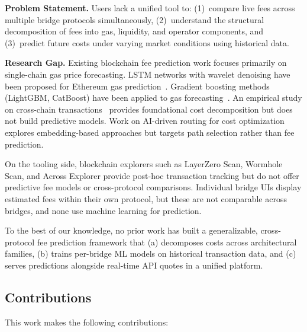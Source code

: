 \textbf{Problem Statement.} Users lack a unified tool to: (1)~compare live fees across multiple bridge protocols simultaneously, (2)~understand the structural decomposition of fees into gas, liquidity, and operator components, and (3)~predict future costs under varying market conditions using historical data.

\textbf{Research Gap.} Existing blockchain fee prediction work focuses primarily on single-chain gas price forecasting. LSTM networks with wavelet denoising have been proposed for Ethereum gas prediction~\cite{lstm_gas}. Gradient boosting methods (LightGBM, CatBoost) have been applied to gas forecasting~\cite{gbm_gas}. An empirical study on cross-chain transactions~\cite{empirical_cc} provides foundational cost decomposition but does not build predictive models. Work on AI-driven routing for cost optimization~\cite{ai_routing} explores embedding-based approaches but targets path selection rather than fee prediction.

On the tooling side, blockchain explorers such as LayerZero Scan, Wormhole Scan, and Across Explorer provide post-hoc transaction tracking but do not offer predictive fee models or cross-protocol comparisons. Individual bridge UIs display estimated fees within their own protocol, but these are not comparable across bridges, and none use machine learning for prediction.

To the best of our knowledge, no prior work has built a generalizable, cross-protocol fee prediction framework that (a) decomposes costs across architectural families, (b) trains per-bridge ML models on historical transaction data, and (c) serves predictions alongside real-time API quotes in a unified platform.

\subsection{Contributions}\label{sec: contributions}

This work makes the following contributions:

